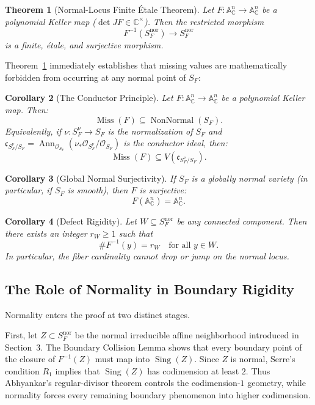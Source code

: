\documentclass[11pt,reqno]{amsart}
\theoremstyle{plain}
\newtheorem{theorem}{Theorem}[section]
\newtheorem{corollary}[theorem]{Corollary}
\theoremstyle{definition}
\numberwithin{equation}{section}
\DeclareMathOperator{\Ann}{Ann}
\DeclareMathOperator{\Sing}{Sing}
\DeclareMathOperator{\NonNormal}{NonNormal}
\DeclareMathOperator{\Miss}{Miss}
\newcommand{\A}{\mathbb{A}}
\newcommand{\C}{\mathbb{C}}
\newcommand{\cO}{\mathcal{O}}
\newcommand{\fc}{\mathfrak{c}}
\begin{document}
\begin{theorem}[Normal-Locus Finite \'{E}tale Theorem]\label{thm:normal-locus}
Let $F: \A^n_\C \to \A^n_\C$ be a polynomial Keller map ($\det JF \in \C^\times$). Then the restricted morphism
\[
F^{-1}(S_F^{\mathrm{nor}}) \longrightarrow S_F^{\mathrm{nor}}
\]
is a finite, \'{e}tale, and surjective morphism.
\end{theorem}

Theorem~\ref{thm:normal-locus} immediately establishes that missing values are mathematically forbidden from occurring at any normal point of $S_F$:

\begin{corollary}[The Conductor Principle]\label{cor:conductor}
Let $F: \A^n_\C \to \A^n_\C$ be a polynomial Keller map. Then:
\[
\Miss(F) \subseteq \NonNormal(S_F).
\]
Equivalently, if $\nu: S_F^\nu \to S_F$ is the normalization of $S_F$ and $\fc_{S_F^\nu / S_F} = \Ann_{\cO_{S_F}}(\nu_* \cO_{S_F^\nu} / \cO_{S_F})$ is the conductor ideal, then:
\[
\Miss(F) \subseteq V(\fc_{S_F^\nu / S_F}).
\]
\end{corollary}

\begin{corollary}[Global Normal Surjectivity]\label{cor:normal-surjectivity}
If $S_F$ is a globally normal variety (in particular, if $S_F$ is smooth), then $F$ is surjective:
\[
F(\A^n_\C) = \A^n_\C.
\]
\end{corollary}

\begin{corollary}[Defect Rigidity]\label{cor:defect-rigidity}
Let $W \subseteq S_F^{\mathrm{nor}}$ be any connected component. Then there exists an integer $r_W \ge 1$ such that
\[
\#F^{-1}(y) = r_W \quad \text{for all } y \in W.
\]
In particular, the fiber cardinality cannot drop or jump on the normal locus.
\end{corollary}

\subsection{The Role of Normality in Boundary Rigidity}

Normality enters the proof at two distinct stages.

First, let $Z \subset S_F^{\mathrm{nor}}$ be the normal irreducible affine neighborhood introduced in Section~3.  The Boundary Collision Lemma shows that every boundary point of the closure of $F^{-1}(Z)$ must map into $\Sing(Z)$.  Since $Z$ is normal, Serre's condition $R_1$ implies that $\Sing(Z)$ has codimension at least $2$.  Thus Abhyankar's regular-divisor theorem controls the codimension-$1$ geometry, while normality forces every remaining boundary phenomenon into higher codimension.
\end{document}
